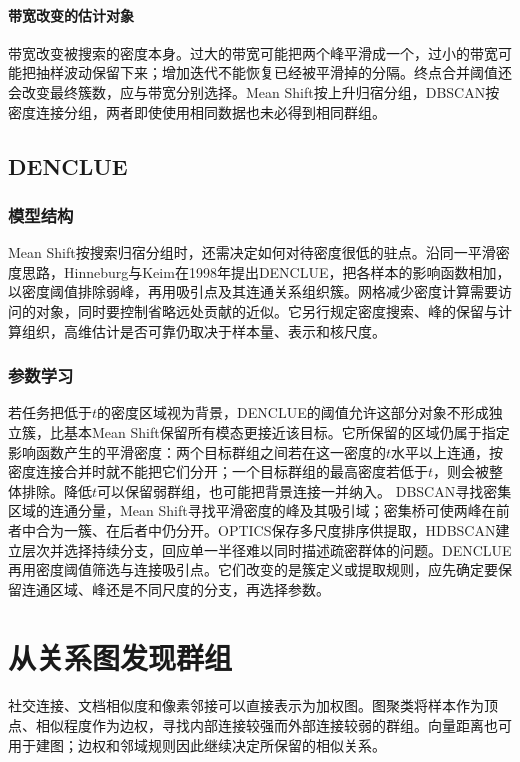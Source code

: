 \paragraph{带宽改变的估计对象}

带宽改变被搜索的密度本身。过大的带宽可能把两个峰平滑成一个，过小的带宽可能把抽样波动保留下来；增加迭代不能恢复已经被平滑掉的分隔。终点合并阈值还会改变最终簇数，应与带宽分别选择。Mean Shift按上升归宿分组，DBSCAN按密度连接分组，两者即使使用相同数据也未必得到相同群组。
\subsection{DENCLUE}

\subsubsection{模型结构}

Mean Shift按搜索归宿分组时，还需决定如何对待密度很低的驻点。沿同一平滑密度思路，Hinneburg与Keim在1998年提出DENCLUE，把各样本的影响函数相加，以密度阈值排除弱峰，再用吸引点及其连通关系组织簇。网格减少密度计算需要访问的对象，同时要控制省略远处贡献的近似。它另行规定密度搜索、峰的保留与计算组织，高维估计是否可靠仍取决于样本量、表示和核尺度。

\subsubsection{参数学习}

若任务把低于$t$的密度区域视为背景，DENCLUE的阈值允许这部分对象不形成独立簇，比基本Mean Shift保留所有模态更接近该目标。它所保留的区域仍属于指定影响函数产生的平滑密度：两个目标群组之间若在这一密度的$t$水平以上连通，按密度连接合并时就不能把它们分开；一个目标群组的最高密度若低于$t$，则会被整体排除。降低$t$可以保留弱群组，也可能把背景连接一并纳入。
DBSCAN寻找密集区域的连通分量，Mean Shift寻找平滑密度的峰及其吸引域；密集桥可使两峰在前者中合为一簇、在后者中仍分开。OPTICS保存多尺度排序供提取，HDBSCAN建立层次并选择持续分支，回应单一半径难以同时描述疏密群体的问题。DENCLUE再用密度阈值筛选与连接吸引点。它们改变的是簇定义或提取规则，应先确定要保留连通区域、峰还是不同尺度的分支，再选择参数。
\section{从关系图发现群组}
\label{sec:clustering-graph}

社交连接、文档相似度和像素邻接可以直接表示为加权图。图聚类将样本作为顶点、相似程度作为边权，寻找内部连接较强而外部连接较弱的群组。向量距离也可用于建图；边权和邻域规则因此继续决定所保留的相似关系。

